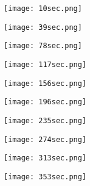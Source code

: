 \documentclass[12pt]{article}
\begin{document}
\begin{figure}[H]
	\centering
	\begin{minipage}{.5\textwidth}
		\centering
		\texttt{[image: 10sec.png]}
	\end{minipage}%
	\begin{minipage}{.5\textwidth}
		\centering
		\texttt{[image: 39sec.png]}
	\end{minipage}
\end{figure}

\begin{figure}[H]
	\centering
	\begin{minipage}{.5\textwidth}
		\centering
		\texttt{[image: 78sec.png]}
	\end{minipage}%
	\begin{minipage}{.5\textwidth}
		\centering
		\texttt{[image: 117sec.png]}
	\end{minipage}
\end{figure}

\begin{figure}[H]
	\centering
	\begin{minipage}{.5\textwidth}
		\centering
		\texttt{[image: 156sec.png]}
	\end{minipage}%
	\begin{minipage}{.5\textwidth}
		\centering
		\texttt{[image: 196sec.png]}
	\end{minipage}
\end{figure}

\begin{figure}[H]
	\centering
	\begin{minipage}{.5\textwidth}
		\centering
		\texttt{[image: 235sec.png]}
	\end{minipage}%
	\begin{minipage}{.5\textwidth}
		\centering
		\texttt{[image: 274sec.png]}
	\end{minipage}
\end{figure}

\begin{figure}[H]
	\centering
	\begin{minipage}{.5\textwidth}
		\centering
		\texttt{[image: 313sec.png]}
	\end{minipage}%
	\begin{minipage}{.5\textwidth}
		\centering
		\texttt{[image: 353sec.png]}
	\end{minipage}
\end{figure}
\end{document}
